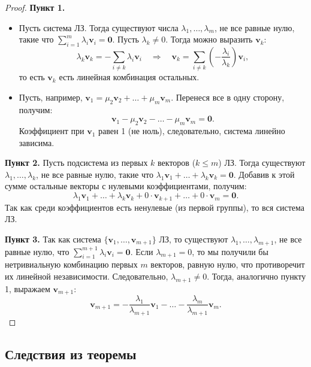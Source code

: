 \documentclass[10pt]{article}
\begin{document}
\begin{proof}
\textbf{Пункт 1.}
\begin{itemize}
    \item[\(\Rightarrow\)] Пусть система ЛЗ. Тогда существуют числа \(\lambda_1, \dots, \lambda_m\), не все равные нулю, такие что \(\sum_{i=1}^m \lambda_i \mathbf{v}_i = \mathbf{0}\). Пусть \(\lambda_k \neq 0\). Тогда можно выразить \(\mathbf{v}_k\):
    \[
    \lambda_k \mathbf{v}_k = -\sum_{i \neq k} \lambda_i \mathbf{v}_i \quad \Rightarrow \quad \mathbf{v}_k = \sum_{i \neq k} \left(-\frac{\lambda_i}{\lambda_k}\right) \mathbf{v}_i,
    \]
    то есть \(\mathbf{v}_k\) есть линейная комбинация остальных.
    \item[\(\Leftarrow\)] Пусть, например, \(\mathbf{v}_1 = \mu_2 \mathbf{v}_2 + \dots + \mu_m \mathbf{v}_m\). Перенеся все в одну сторону, получим:
    \[
    \mathbf{v}_1 - \mu_2 \mathbf{v}_2 - \dots - \mu_m \mathbf{v}_m = \mathbf{0}.
    \]
    Коэффициент при \(\mathbf{v}_1\) равен 1 (не ноль), следовательно, система линейно зависима.
\end{itemize}

\textbf{Пункт 2.} Пусть подсистема из первых \(k\) векторов (\(k \le m\)) ЛЗ. Тогда существуют \(\lambda_1, \dots, \lambda_k\), не все равные нулю, такие что \(\lambda_1 \mathbf{v}_1 + \dots + \lambda_k \mathbf{v}_k = \mathbf{0}\). Добавив к этой сумме остальные векторы с нулевыми коэффициентами, получим:
\[
\lambda_1 \mathbf{v}_1 + \dots + \lambda_k \mathbf{v}_k + 0\cdot \mathbf{v}_{k+1} + \dots + 0\cdot \mathbf{v}_m = \mathbf{0}.
\]
Так как среди коэффициентов есть ненулевые (из первой группы), то вся система ЛЗ.

\textbf{Пункт 3.} Так как система \(\{\mathbf{v}_1, \dots, \mathbf{v}_{m+1}\}\) ЛЗ, то существуют \(\lambda_1, \dots, \lambda_{m+1}\), не все равные нулю, что \(\sum_{i=1}^{m+1} \lambda_i \mathbf{v}_i = \mathbf{0}\). Если \(\lambda_{m+1} = 0\), то мы получили бы нетривиальную комбинацию первых \(m\) векторов, равную нулю, что противоречит их линейной независимости. Следовательно, \(\lambda_{m+1} \neq 0\). Тогда, аналогично пункту 1, выражаем \(\mathbf{v}_{m+1}\):
\[
\mathbf{v}_{m+1} = -\frac{\lambda_1}{\lambda_{m+1}} \mathbf{v}_1 - \dots - \frac{\lambda_m}{\lambda_{m+1}} \mathbf{v}_m.
\]
\end{proof}

\subsection*{Следствия из теоремы}
\end{document}
